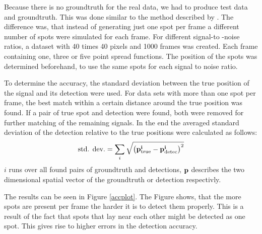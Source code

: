 Because there is no groundtruth for the real data, we had to produce test data and groundtruth. This was done similar to the method described by \cite{simulated}. The difference was, that instead of generating just one spot per frame a different number of spots were simulated for each frame. For different signal-to -noise ratios, a dataset with 40 times 40 pixels and 1000 frames was created. Each frame containing one, three or five point spread functions. The position of the spots was determined beforehand, to use the same spots for each signal to noise ratio.\newline

To determine the accuracy, the standard deviation between the true position of the signal and its detection were used. For data sets with more than one spot per frame, the best match within a certain distance around the true position was found. If a pair of true spot and detection were found, both were removed for further matching of the remaining signals. In the end the averaged standard deviation of the detection relative to the true positions were calculated as follows:
\begin{align}
	\text{std. dev.} = \sum_i \sqrt{\left(\bf{p}_{\text{true}}^i - \bf{p}_{\text{detec}}^i\right)^2}
\end{align}
$i$ runs over all found pairs of groundtruth and detections, $\bf{p}$ describes the two dimensional spatial vector of the groundtruth or detection respectivly.\newline

The results can be seen in Figure \ref{accplot}. The Figure shows, that the more spots are present per frame the harder it is to detect them properly. This is a result of the fact that spots that lay near each other might be detected as one spot. This gives rise to higher errors in the detection accuracy.


